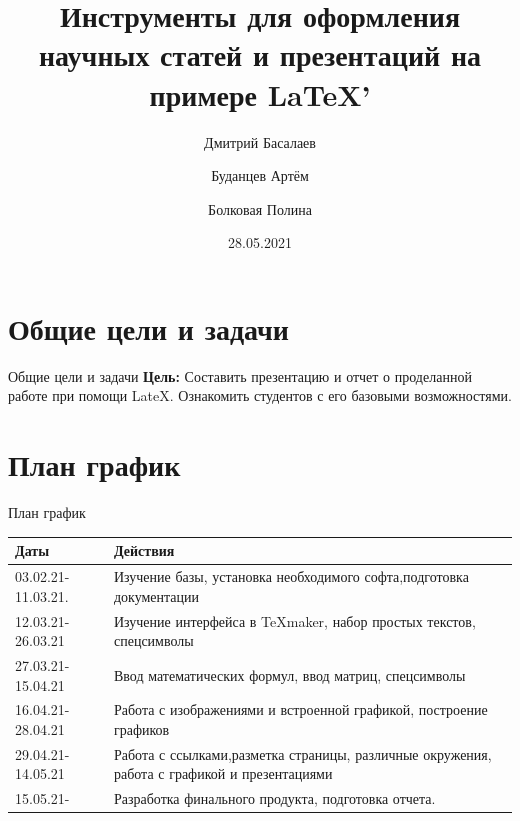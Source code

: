 \documentclass{beamer}[aspectratio=169]
\title[Презентация]{Инструменты для оформления научных статей и презентаций на примере \LaTeX'}
\institute{КемГУ}
\author{Дмитрий Басалаев \and Буданцев Артём \and Болковая Полина}
\date{28.05.2021}
\begin{document}
\newlength\someheight
\setlength\someheight{2cm}



\begin{frame}
\maketitle
\end{frame}


\section{Общие цели и задачи}
\begin{frame}{Общие цели и задачи}
\transdissolve
\textbf{Цель:} Составить презентацию и отчет о проделанной работе при помощи LateX. Ознакомить студентов с его базовыми возможностями.
\end{frame}

\section{План график}
\begin{frame}{План график}
\transboxout
\begin{tabular}{| l| p{6.7cm}|}
\hline {\bfseries \large Даты} & {\bfseries \large Действия}\\ \hline
03.02.21-11.03.21. & Изучение базы, установка необходимого софта,подготовка документации\\ \hline
12.03.21-26.03.21 & Изучение интерфейса в \TeX maker, набор простых текстов, спецсимволы \\ \hline
27.03.21-15.04.21 & Ввод математических формул, ввод матриц, спецсимволы  \\ \hline
16.04.21-28.04.21 & Работа с изображениями и встроенной графикой, построение графиков \\ \hline 
29.04.21-14.05.21 & Работа с ссылками,разметка страницы, различные окружения, работа с графикой и презентациями \\ \hline
15.05.21- & Разработка финального продукта, подготовка отчета. \\ \hline
\end{tabular}

\end{frame}
\end{document}
